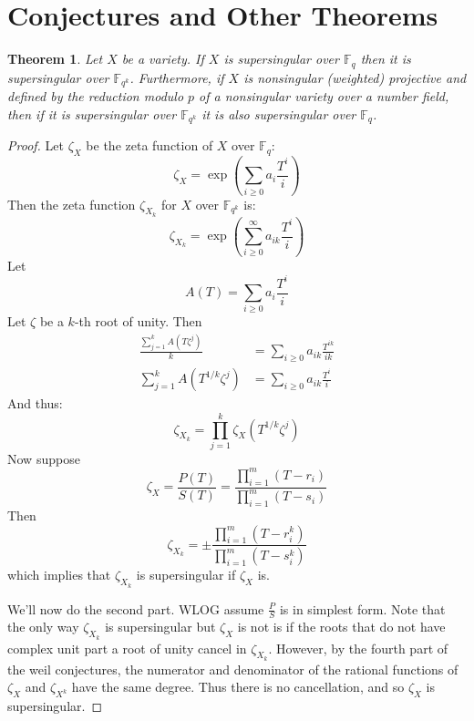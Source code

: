 \documentclass{article}
\newcommand{\F}{\mathbb{F}}
\newtheorem{theorem}{Theorem}[section]
\theoremstyle{definition}
\theoremstyle{definition}
\theoremstyle{remark}
\begin{document}
\section{Conjectures and Other Theorems}
\begin{theorem} \label{thm:base_field_shifting}
Let $X$ be a variety. If $X$ is supersingular over $\F_q$ then it is supersingular over $\F_{q^k}$. Furthermore, if $X$ is nonsingular (weighted) projective and defined by the reduction modulo $p$ of a nonsingular variety over a number field, then if it is supersingular over $\F_{q^k}$ it is also supersingular over $\F_q$.
\end{theorem} 
\begin{proof}
Let $\zeta_X$ be the zeta function of $X$ over $\F_q$:
\[\zeta_X = \exp\left(\sum_{i\ge 0} a_i \frac{T^i}{i}\right)\]
Then the zeta function $\zeta_{X_k}$ for $X$ over $\F_{q^k}$ is:
\[\zeta_{X_k} = \exp\left(\sum_{i\ge 0}^{\infty} a_{ik} \frac{T^i}{i}\right)\]
Let
\[A(T) = \sum_{i\ge 0} a_i \frac{T^i}{i}\]
Let $\zeta$ be a $k$-th root of unity. Then 
\begin{align*} \frac{\sum_{j = 1}^k A(T\zeta^j)}{k} &= \sum_{i \ge 0} a_{ik} \frac{T^{ik}}{ik} \\
\sum_{j = 1}^k A({T^{1/k}}\zeta^j) &= \sum_{i \ge 0} a_{ik} \frac{T^{i}}{i} \end{align*}
And thus:
\[\zeta_{X_k} = \prod_{j = 1}^k \zeta_X(T^{1/k}\zeta^j)\]
Now suppose 
\[\zeta_X = \frac{P(T)}{S(T)} = \frac{\prod_{i = 1}^m (T - r_i)}{\prod_{i = 1}^m (T - s_i)}\]
Then 
\[\zeta_{X_k} = \pm\frac{\prod_{i = 1}^m (T - r_i^k)}{\prod_{i = 1}^m (T - s_i^k)}\]
which implies that $\zeta_{X_k}$ is supersingular if $\zeta_X$ is.
\par
We'll now do the second part. WLOG assume $\frac{P}{S}$ is in simplest form. Note that the only way $\zeta_{X_k}$ is supersingular but $\zeta_X$ is not is if the roots that do not have complex unit part a root of unity cancel in $\zeta_{X_k}$. However, by the fourth part of the weil conjectures, the numerator and denominator of the rational functions of $\zeta_X$ and $\zeta_{X^k}$ have the same degree. Thus there is no cancellation, and so $\zeta_X$ is supersingular.
\end{proof}



\begin{comment}
\begin{theorem}
Given \[x_0^{n_0} + \dots + x_3^{n_3} = 0\] over field $F_p$, there exists d such that the variety is unirational if $q \equiv -1 \mod d$, where $d = \text{gcd}(n_0, \dots, n_3)$. 
\end{theorem}
\begin{proof}
Suppose that $n_i = d k_i$, and $i = 0,1,2,3$ and let $w_i = x_i^{k_i}$.
\end{proof}
\end{comment}
\end{document}
